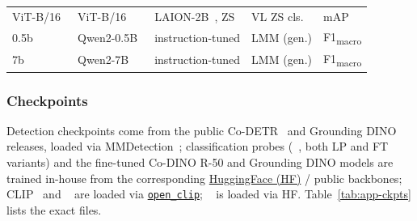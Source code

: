\begin{table}[h]
{\begin{tabular}{@{}lllll@{}}
\openclip{} ViT-B/16~\cite{cherti2023reproducible}      & ViT-B/16       & LAION-2B~\cite{schuhmann2022laionb}, ZS                 & VL ZS cls.        & mAP \\
\llava{} 0.5b~\cite{li2024llava}             & Qwen2-0.5B~\cite{qwen2024qwen25}     & instruction-tuned            & LMM (gen.)        & F1\textsubscript{macro} \\
\llava{} 7b~\cite{li2024llava}               & Qwen2-7B~\cite{qwen2024qwen25}       & instruction-tuned            & LMM (gen.)        & F1\textsubscript{macro} \\
\bottomrule
\end{tabular}
}
\end{table}

\subsubsection{Checkpoints}\label{app:exp-ckpts}

Detection checkpoints come from the public Co-DETR~\cite{zong2023detrs} 
and Grounding DINO~\cite{liu2024grounding} releases, loaded via MMDetection~\cite{chen2019mmdetection}; classification probes (\dinov{}~\cite{simeoni2025dinov3}, both LP and FT variants) and the fine-tuned Co-DINO R-50 and Grounding DINO models are trained in-house from the corresponding \href{https://huggingface.co/}{HuggingFace (HF)} / public backbones; CLIP~\cite{radford2021learning} and \openclip{}~\cite{cherti2023reproducible} are loaded via \href{https://github.com/mlfoundations/open_clip}{\texttt{open\_clip}}; \llava{}~\cite{li2024llava} is loaded via HF. Table~\ref{tab:app-ckpts} lists the exact files. 

